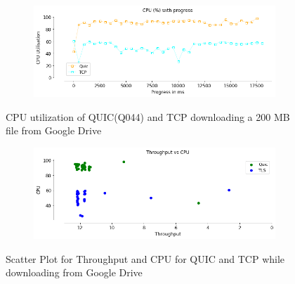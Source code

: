 \begin{frame}

\begin{figure}[!htb]
    \centering
    \begin{subfigure}{0.45\textwidth}
        \includegraphics[width=\linewidth]{./plots/PI/cpu/cpupercentprogress.png}
    \end{subfigure}
    
    \caption{CPU utilization of QUIC(Q044) and TCP downloading a 200 MB file from Google Drive}\label{fig:cpu-utilization-of}
\end{figure}

%

\begin{figure}[!htb]
    \centering
    \begin{subfigure}{0.45\textwidth}
        \includegraphics[width=\linewidth]{./plots/PI/throughputvscpu/ThroughputvsCPU.png}
    \end{subfigure}
    
    \caption{Scatter Plot for Throughput and CPU for QUIC and TCP while downloading from Google Drive}\label{fig:scatter-plot-for}
\end{figure}

\end{frame}
\clearpage

